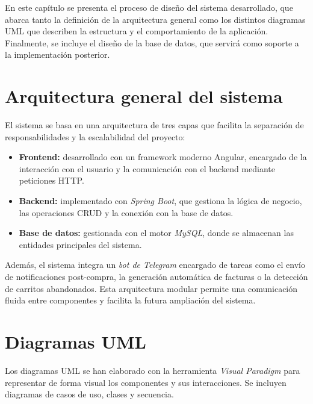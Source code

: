 


En este capítulo se presenta el proceso de diseño del sistema desarrollado, que abarca tanto la definición de la arquitectura general como los distintos diagramas UML que describen la estructura y el comportamiento de la aplicación. Finalmente, se incluye el diseño de la base de datos, que servirá como soporte a la implementación posterior.

\section{Arquitectura general del sistema}

El sistema se basa en una arquitectura de tres capas que facilita la separación de responsabilidades y la escalabilidad del proyecto:

\begin{itemize}
    \item \textbf{Frontend:} desarrollado con un framework moderno Angular, encargado de la interacción con el usuario y la comunicación con el backend mediante peticiones HTTP.
    \item \textbf{Backend:} implementado con \textit{Spring Boot}, que gestiona la lógica de negocio, las operaciones CRUD y la conexión con la base de datos.
    \item \textbf{Base de datos:} gestionada con el motor \textit{MySQL}, donde se almacenan las entidades principales del sistema.
\end{itemize}

Además, el sistema integra un \textit{bot de Telegram} encargado de tareas como el envío de notificaciones post-compra, la generación automática de facturas o la detección de carritos abandonados.  
Esta arquitectura modular permite una comunicación fluida entre componentes y facilita la futura ampliación del sistema.

\section{Diagramas UML}

Los diagramas UML se han elaborado con la herramienta \textit{Visual Paradigm} para representar de forma visual los componentes y sus interacciones. Se incluyen diagramas de casos de uso, clases y secuencia.

